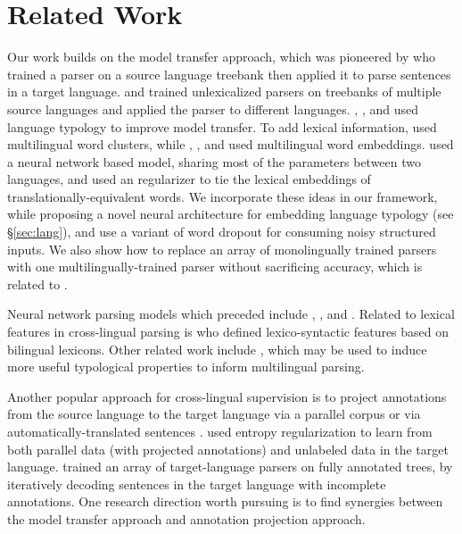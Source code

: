 \documentclass[11pt]{article}
\begin{document}
\section{Related Work}
\label{sec:related}
Our work builds on the model transfer approach, which was pioneered by  who trained a parser on a source language treebank then applied it to parse sentences in a target language.
 and  trained unlexicalized parsers on treebanks of multiple source languages and applied the parser to different languages.
, , and  used language typology to improve model transfer.
To add lexical information,  used multilingual word clusters, while , ,  and  used multilingual word embeddings.
 used a neural network based model, sharing most of the parameters between two languages, and used an  regularizer to tie the lexical embeddings of translationally-equivalent words.
We incorporate these ideas in our framework, while proposing a novel neural architecture for embedding language typology (see \S\ref{sec:lang}), and use a variant of word dropout \cite{iyyer:15} for consuming noisy structured inputs.
We also show how to replace an array of monolingually trained parsers with one multilingually-trained parser without sacrificing accuracy, which is related to .

Neural network parsing models which preceded  include , ,  and .
Related to lexical features in cross-lingual parsing is  who defined lexico-syntactic features based on bilingual lexicons.
Other related work include , which may be used to induce more useful typological properties to inform multilingual parsing.

Another popular approach for cross-lingual supervision is to project annotations from the source language to the target language via a parallel corpus \cite{yarowsky:01,hwa:05} or via automatically-translated sentences \cite{tiedemann:14b}. 
 used entropy regularization to learn from both parallel data (with projected annotations) and unlabeled data in the target language.
 trained an array of target-language parsers on fully annotated trees, by iteratively decoding sentences in the target language with incomplete annotations. 
One research direction worth pursuing is to find synergies between the model transfer approach and annotation projection approach.
\end{document}
